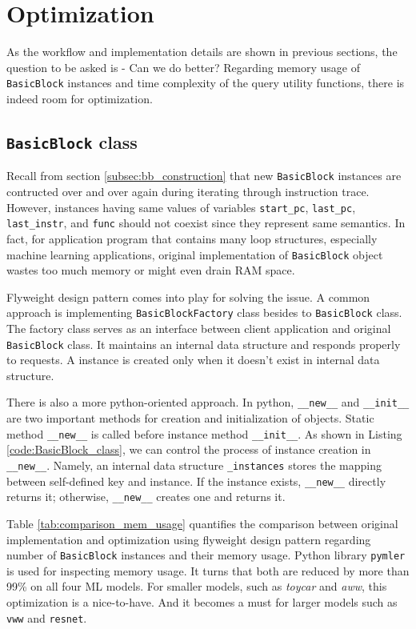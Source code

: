\section{Optimization}
As the workflow and implementation details are shown in previous sections, the question to be asked is - Can we do better? Regarding memory usage of \texttt{BasicBlock} instances and time complexity of the query utility functions, there is indeed room for optimization. 

\subsection{\texttt{BasicBlock} class}
\label{subsec:basicblock_optimization}

Recall from section \ref{subsec:bb_construction} that new \texttt{BasicBlock} instances are contructed over and over again during iterating through instruction trace. However, instances having same values of variables \texttt{start\_pc}, \texttt{last\_pc}, \texttt{last\_instr}, and \texttt{func} should not coexist since they represent same semantics. In fact, for application program that contains many loop structures, especially machine learning applications, original implementation of \texttt{BasicBlock} object wastes too much memory or might even drain RAM space.

Flyweight design pattern comes into play for solving the issue. A common approach is implementing \texttt{BasicBlockFactory} class besides to \texttt{BasicBlock} class. The factory class serves as an interface between client application and original \texttt{BasicBlock} class. It maintains an internal data structure and responds properly to requests. A instance is created only when it doesn't exist in internal data structure.

There is also a more python-oriented approach. In python, \texttt{\_\_new\_\_} and \texttt{\_\_init\_\_} are two important methods for creation and initialization of objects. Static method \texttt{\_\_new\_\_} is called before instance method \texttt{\_\_init\_\_}. As shown in Listing \ref{code:BasicBlock_class}, we can control the process of instance creation in \texttt{\_\_new\_\_}. Namely, an internal data structure \texttt{\_instances} stores the mapping between self-defined key and instance. If the instance exists, \texttt{\_\_new\_\_} directly returns it; otherwise, \texttt{\_\_new\_\_} creates one and returns it.

Table \ref{tab:comparison_mem_usage} quantifies the comparison between original implementation and optimization using flyweight design pattern regarding number of \texttt{BasicBlock} instances and their memory usage. Python library \texttt{pymler} is used for inspecting memory usage. It turns that both are reduced by more than 99\% on all four ML models. For smaller models, such as \textit{toycar} and \textit{aww}, this optimization is a nice-to-have. And it becomes a must for larger models such as \texttt{vww} and \texttt{resnet}.

